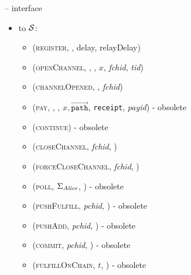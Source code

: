 \begin{figure}[H]
\begin{systembox}{\fpaynet{} -- interface}
\begin{itemize}
      \item to $\mathcal{S}$:
      \begin{itemize}
        \item (\textsc{register}, \alice, delay, relayDelay)
        \item (\textsc{openChannel}, \alice, \bob, $x$, \textit{fchid},
        \textit{tid})
        \item (\textsc{channelOpened}, \alice, \textit{fchid})
        \item (\textsc{pay}, \alice, \bob, $x,
        $, \texttt{receipt}, \textit{payid})
        {\color{blue} - obsolete}
        \item (\textsc{continue}) {\color{blue} - obsolete}
        \item (\textsc{closeChannel}, \textit{fchid}, \alice)
        \item (\textsc{forceCloseChannel}, \textit{fchid}, \alice)
        \item (\textsc{poll}, $\Sigma_{\mathit{Alice}}$, \alice) {\color{blue} -
        obsolete}
        \item (\textsc{pushFulfill}, \textit{pchid}, \alice) {\color{blue} -
        obsolete}
        \item (\textsc{pushAdd}, \textit{pchid}, \alice) {\color{blue} -
        obsolete}
        \item (\textsc{commit}, \textit{pchid}, \alice) {\color{blue} -
        obsolete}
        \item (\textsc{fulfillOnChain}, $t$, \alice) {\color{blue} - obsolete}
      \end{itemize}
    \end{itemize}
  \end{systembox}
  \caption{}
  \label{alg:fpaynet:interface}
\end{figure}

